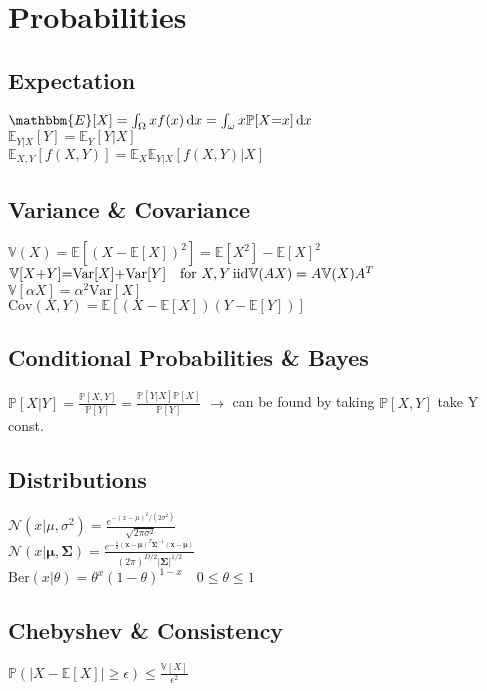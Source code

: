 \section*{Probabilities}
\subsection*{Expectation}
$\mathbbm{E}[X]=\int_{\Omega}xf(x)\di x=\int_{\omega}x\mathbb{P}[X{=}x]\di x$ \\
$\mathbb{E}_{Y|X}[Y]=\mathbb{E}_{Y}[Y|X]$\\
$\mathbb{E}_{X,Y}[f(X,Y)]=\mathbb{E}_{X}\mathbb{E}_{Y|X}[f(X,Y)|X]$

\subsection*{Variance \& Covariance}
$\mathbb{V}(X){=}\mathbb{E}[(X{-}\mathbb{E}[X])^2]{=}\mathbb{E}[X^2]{-}\mathbb{E}[X]^2$\\
$\mathbb{V}[X{+}Y]{=}\mathrm{Var}[X]{+}\mathrm{Var}[Y] \quad \text{for }X,Y \,\text{iid} \\
\mathbb{V}(AX) = A \mathbb{V}(X) A^T$ \\
$\mathbb{V}[\alpha X]=\alpha^2\mathrm{Var}[X]$ \\
$\mathrm{Cov}(X,Y)=\mathbb{E}[(X-\mathbb{E}[X])(Y-\mathbb{E}[Y])]$

\subsection*{Conditional Probabilities \& Bayes}
$\mathbb{P}[X|Y]=\frac{\mathbb{P}[X,Y]}{\mathbb{P}[Y]}=\frac{\mathbb{P}[Y|X]\mathbb{P}[X]}{\mathbb{P}[Y]}$
$\rightarrow$ can be found by taking $\mathbb{P}[X,Y]$ take Y const.

\subsection*{Distributions}
$\mathcal{N}(x|\mu, \sigma^2)=\frac{e^{-(x-\mu)^2/(2\sigma^2)}}{\sqrt{2\pi\sigma^2}}$\\
$\mathcal{N}(x|\bm{\mu}, \bm{\Sigma})= \frac{e^{-\frac{1}{2}(\mathbf{x}-\bm{\mu})^T\bm{\Sigma}^{-1}(\mathbf{x}-\bm{\mu})}}{(2\pi)^{D/2}|\bm{\Sigma}|^{1/2}} $\\
$\text{Ber}(x|\theta) = \theta^x(1-\theta)^{1-x} \quad 0 \leq \theta \leq 1$
\subsection*{Chebyshev \& Consistency}
$\mathbb{P}(|X-\mathbb{E}[X]|\geq \epsilon)\leq \frac{\mathbb{V}[X]}{\epsilon^2}$
